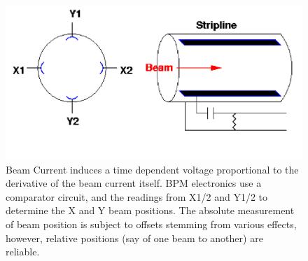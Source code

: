 \begin{figure}
\begin{center}
\includegraphics[width=1.0\linewidth]{./figures/bpm_schematic}
\caption{ Beam Current induces a time dependent voltage proportional to the derivative of
the beam current itself. BPM electronics use a comparator circuit, and the readings from
X1/2 and Y1/2 to determine the X and Y beam positions. The absolute measurement of beam
position is subject to offsets stemming from various effects, however, relative positions
(say of one beam to another) are reliable.~\cite{kawallfocus2005}}
\label{fig:bpm_schematic_cartoon}
\end{center}
\end{figure}
